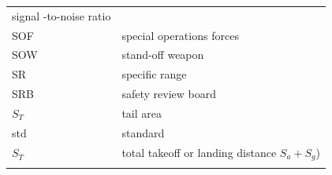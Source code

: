 \documentclass[
]{book}
\begin{document}
\begin{longtable}[]{@{}ll@{}}
\begin{minipage}[t]{0.47\columnwidth}
signal -to-noise ratio\strut
\end{minipage}\tabularnewline
\begin{minipage}[t]{0.47\columnwidth}\raggedright
SOF\strut
\end{minipage} & \begin{minipage}[t]{0.47\columnwidth}\raggedright
special operations forces\strut
\end{minipage}\tabularnewline
\begin{minipage}[t]{0.47\columnwidth}\raggedright
SOW\strut
\end{minipage} & \begin{minipage}[t]{0.47\columnwidth}\raggedright
stand-off weapon\strut
\end{minipage}\tabularnewline
\begin{minipage}[t]{0.47\columnwidth}\raggedright
SR\strut
\end{minipage} & \begin{minipage}[t]{0.47\columnwidth}\raggedright
specific range\strut
\end{minipage}\tabularnewline
\begin{minipage}[t]{0.47\columnwidth}\raggedright
SRB\strut
\end{minipage} & \begin{minipage}[t]{0.47\columnwidth}\raggedright
safety review board\strut
\end{minipage}\tabularnewline
\begin{minipage}[t]{0.47\columnwidth}\raggedright
\(S_T\)\strut
\end{minipage} & \begin{minipage}[t]{0.47\columnwidth}\raggedright
tail area\strut
\end{minipage}\tabularnewline
\begin{minipage}[t]{0.47\columnwidth}\raggedright
std\strut
\end{minipage} & \begin{minipage}[t]{0.47\columnwidth}\raggedright
standard\strut
\end{minipage}\tabularnewline
\begin{minipage}[t]{0.47\columnwidth}\raggedright
\(S_T\)\strut
\end{minipage} & \begin{minipage}[t]{0.47\columnwidth}\raggedright
total takeoff or landing distance \(S_a + S_g\))\strut
\end{minipage}\tabularnewline
\begin{minipage}[t]{0.47\columnwidth}\raggedright

\end{minipage}
\end{longtable}
\end{document}
